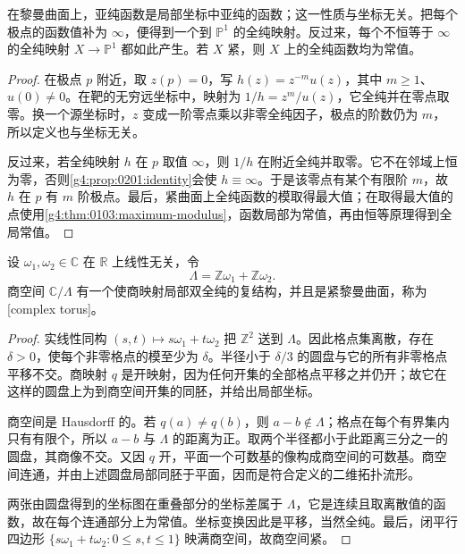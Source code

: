 \begin{proposition}
	\label{g4:prop:0201:meromorphic-map}
	在黎曼曲面上，亚纯函数是局部坐标中亚纯的函数；这一性质与坐标无关。把每个极点的函数值补为 \(\infty\)，便得到一个到 \(\mathbb P^1\) 的全纯映射。反过来，每个不恒等于 \(\infty\) 的全纯映射 \(X\to\mathbb P^1\) 都如此产生。若 \(X\) 紧，则 \(X\) 上的全纯函数均为常值。
\end{proposition}
\begin{proof}
	在极点 \(p\) 附近，取 \(z(p)=0\)，写 \(h(z)=z^{-m}u(z)\)，其中 \(m\geq1\)、\(u(0)\ne0\)。在靶的无穷远坐标中，映射为 \(1/h=z^m/u(z)\)，它全纯并在零点取零。换一个源坐标时，\(z\) 变成一阶零点乘以非零全纯因子，极点的阶数仍为 \(m\)，所以定义也与坐标无关。

	反过来，若全纯映射 \(h\) 在 \(p\) 取值 \(\infty\)，则 \(1/h\) 在附近全纯并取零。它不在邻域上恒为零，否则\cref{g4:prop:0201:identity}会使 \(h\equiv\infty\)。于是该零点有某个有限阶 \(m\)，故 \(h\) 在 \(p\) 有 \(m\) 阶极点。最后，紧曲面上全纯函数的模取得最大值；在取得最大值的点使用\cref{g4:thm:0103:maximum-modulus}，函数局部为常值，再由恒等原理得到全局常值。
\end{proof}

\begin{proposition}
	\label{g4:prop:0201:torus}
	设 \(\omega_1,\omega_2\in\mathbb C\) 在 \(\mathbb R\) 上线性无关，令
	\[
		\Lambda=\mathbb Z\omega_1+\mathbb Z\omega_2.
	\]
	商空间 \(\mathbb C/\Lambda\) 有一个使商映射局部双全纯的复结构，并且是紧黎曼曲面，称为[complex torus]。
\end{proposition}
\begin{proof}
	实线性同构 \((s,t)\mapsto s\omega_1+t\omega_2\) 把 \(\mathbb Z^2\) 送到 \(\Lambda\)。因此格点集离散，存在 \(\delta>0\)，使每个非零格点的模至少为 \(\delta\)。半径小于 \(\delta/3\) 的圆盘与它的所有非零格点平移不交。商映射 \(q\) 是开映射，因为任何开集的全部格点平移之并仍开；故它在这样的圆盘上为到商空间开集的同胚，并给出局部坐标。

	商空间是 Hausdorff 的。若 \(q(a)\ne q(b)\)，则 \(a-b\notin\Lambda\)；格点在每个有界集内只有有限个，所以 \(a-b\) 与 \(\Lambda\) 的距离为正。取两个半径都小于此距离三分之一的圆盘，其商像不交。又因 \(q\) 开，平面一个可数基的像构成商空间的可数基。商空间连通，并由上述圆盘局部同胚于平面，因而是符合定义的二维拓扑流形。

	两张由圆盘得到的坐标图在重叠部分的坐标差属于 \(\Lambda\)，它是连续且取离散值的函数，故在每个连通部分上为常值。坐标变换因此是平移，当然全纯。最后，闭平行四边形 \(\{s\omega_1+t\omega_2:0\leq s,t\leq1\}\) 映满商空间，故商空间紧。
\end{proof}

